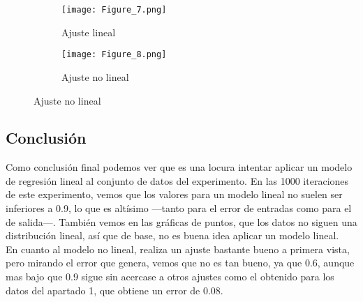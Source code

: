 \begin{figure}[h]
   \centering
   \begin{subfigure}[b]{0.45\textwidth}
      \texttt{[image: Figure\_7.png]}
      \caption{Ajuste lineal}
   \end{subfigure}
   \hfill
   \begin{subfigure}[b]{0.45\textwidth}
      \texttt{[image: Figure\_8.png]}
      \caption{Ajuste no lineal}
   \end{subfigure}
\end{figure}
\subsection{Conclusión}
Como conclusión final podemos ver que es una locura intentar aplicar un modelo de regresión lineal al conjunto de datos del experimento. En las 1000 iteraciones de este experimento, vemos que los valores para un modelo lineal no suelen ser inferiores a 0.9, lo que es altísimo ---tanto para el error de entradas como para el de salida---. También vemos en las gráficas de puntos, que los datos no siguen una distribución lineal, así que de base, no es buena idea aplicar un modelo lineal.\\
En cuanto al modelo no lineal, realiza un ajuste bastante bueno a primera vista, pero mirando el error que genera, vemos que no es tan bueno, ya que 0.6, aunque mas bajo que 0.9 sigue sin acercase a otros ajustes como el obtenido para los datos del apartado 1, que obtiene un error de 0.08.
